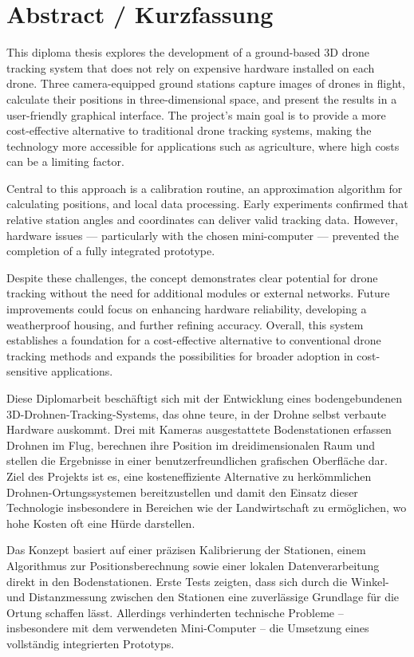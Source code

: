 \chapter*{Abstract / Kurzfassung}
\label{cha:abstract}

This diploma thesis explores the development of a ground-based 3D drone tracking system that does not rely on expensive hardware installed on each drone. Three camera-equipped ground stations capture images of drones in flight, calculate their positions in three-dimensional space, and present the results in a user-friendly graphical interface. The project’s main goal is to provide a more cost-effective alternative to traditional drone tracking systems, making the technology more accessible for applications such as agriculture, where high costs can be a limiting factor.

Central to this approach is a calibration routine, an approximation algorithm for calculating positions, and local data processing. Early experiments confirmed that relative station angles and coordinates can deliver valid tracking data. However, hardware issues — particularly with the chosen mini-computer — prevented the completion of a fully integrated prototype.

Despite these challenges, the concept demonstrates clear potential for drone tracking without the need for additional modules or external networks. Future improvements could focus on enhancing hardware reliability, developing a weatherproof housing, and further refining accuracy. Overall, this system establishes a foundation for a cost-effective alternative to conventional drone tracking methods and expands the possibilities for broader adoption in cost-sensitive applications.

\vspace{1cm}

Diese Diplomarbeit beschäftigt sich mit der Entwicklung eines bodengebundenen 3D-Drohnen-Tracking-Systems, das ohne teure, in der Drohne selbst verbaute Hardware auskommt. Drei mit Kameras ausgestattete Bodenstationen erfassen Drohnen im Flug, berechnen ihre Position im dreidimensionalen Raum und stellen die Ergebnisse in einer benutzerfreundlichen grafischen Oberfläche dar. Ziel des Projekts ist es, eine kosteneffiziente Alternative zu herkömmlichen Drohnen-Ortungssystemen bereitzustellen und damit den Einsatz dieser Technologie insbesondere in Bereichen wie der Landwirtschaft zu ermöglichen, wo hohe Kosten oft eine Hürde darstellen.

Das Konzept basiert auf einer präzisen Kalibrierung der Stationen, einem Algorithmus zur Positionsberechnung sowie einer lokalen Datenverarbeitung direkt in den Bodenstationen. Erste Tests zeigten, dass sich durch die Winkel- und Distanzmessung zwischen den Stationen eine zuverlässige Grundlage für die Ortung schaffen lässt. Allerdings verhinderten technische Probleme – insbesondere mit dem verwendeten Mini-Computer – die Umsetzung eines vollständig integrierten Prototyps.

